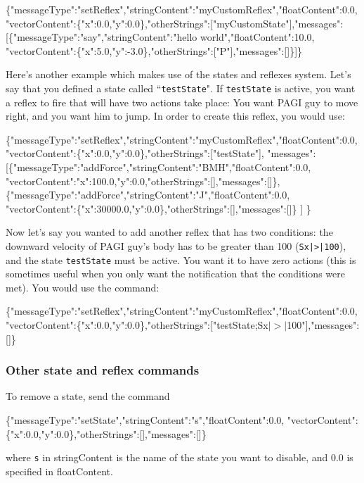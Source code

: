 \begin{itemize}
\begin{center}
	\scriptsize{\{"messageType":"setReflex","stringContent":"myCustomReflex","floatContent":0.0, "vectorContent":\{"x":0.0,"y":0.0\},"otherStrings":["myCustomState"],"messages":[\{"messageType":"say","stringContent":"hello world","floatContent":10.0, "vectorContent":\{"x":5.0,"y":-3.0\},"otherStrings":["P"],"messages":[]\}]\}}
\end{center}
\end{itemize}

Here's another example which makes use of the states and reflexes system. Let's say that you defined a state called ``\texttt{testState}". If \texttt{testState} is active, you want a reflex to fire that will have two actions take place: You want PAGI guy to move right, and you want him to jump. In order to create this reflex, you would use:

\begin{center}
	\scriptsize{\{"messageType":"setReflex","stringContent":"myCustomReflex","floatContent":0.0, "vectorContent":\{"x":0.0,"y":0.0\},"otherStrings":["testState"],
		"messages":[\{"messageType":"addForce","stringContent":"BMH","floatContent":0.0, "vectorContent":{"x":100.0,"y":0.0},"otherStrings":[],"messages":[]\},
		\{"messageType":"addForce","stringContent":"J","floatContent":0.0, "vectorContent":\{"x":30000.0,"y":0.0\},"otherStrings":[],"messages":[]\} ] \}}
\end{center}

Now let's say you wanted to add another reflex that has two conditions: the downward velocity of PAGI guy's body has to be greater than 100 (\texttt{Sx|>|100}), and the state \texttt{testState} must be active. You want it to have zero actions (this is sometimes useful when you only want the notification that the conditions were met). You would use the command:

\begin{center}
	\scriptsize{\{"messageType":"setReflex","stringContent":"myCustomReflex","floatContent":0.0, "vectorContent":\{"x":0.0,"y":0.0\},"otherStrings":["testState;Sx$|>|$100"],"messages":[]\}}
\end{center}

\subsubsection{Other state and reflex commands}

To remove a state, send the command 
\begin{center}
	\scriptsize{\{"messageType":"setState","stringContent":"s","floatContent":0.0, "vectorContent":\{"x":0.0,"y":0.0\},"otherStrings":[],"messages":[]\} }
\end{center}
where \texttt{s} in stringContent is the name of the state you want to disable, and 0.0 is specified in floatContent.

